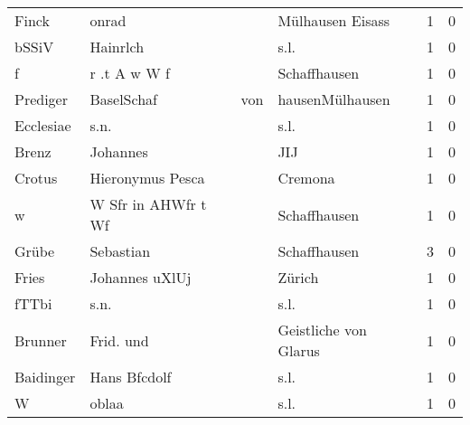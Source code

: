 \documentclass[10pt,a4paper,landscape]{article}
\begin{document}
\begin{longtable}{llllrr}
                    Finck &                              onrad &             &                            Mülhausen Eisass &          1 &         0 \\
                    bSSiV &                           Hainrlch &             &                                        s.l. &          1 &         0 \\
                        f &                       r .t A w W f &             &                                Schaffhausen &          1 &         0 \\
                 Prediger &                         BaselSchaf &         von &                             hausenMülhausen &          1 &         0 \\
                Ecclesiae &                               s.n. &             &                                        s.l. &          1 &         0 \\
                    Brenz &                           Johannes &             &                                         JIJ &          1 &         0 \\
                   Crotus &                   Hieronymus Pesca &             &                                     Cremona &          1 &         0 \\
                        w &                W Sfr in AHWfr t Wf &             &                                Schaffhausen &          1 &         0 \\
                    Grübe &                          Sebastian &             &                                Schaffhausen &          3 &         0 \\
                    Fries &                     Johannes uXlUj &             &                                      Zürich &          1 &         0 \\
                    fTTbi &                               s.n. &             &                                        s.l. &          1 &         0 \\
                  Brunner &                          Frid. und &             &                       Geistliche von Glarus &          1 &         0 \\
                Baidinger &                       Hans Bfcdolf &             &                                        s.l. &          1 &         0 \\
                        W &                              oblaa &             &                                        s.l. &          1 &         0 \\

\end{longtable}
\end{document}
